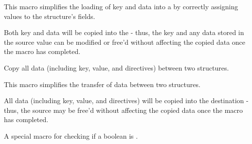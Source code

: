 

\begin{arglist}
\end{arglist}

This macro simplifies the loading of key and data into a  by correctly assigning values to the structure's fields.

\adviceuserstart
Both key and data will be copied into the  - thus, the key and any data stored in the source value can be modified or free'd without affecting the copied data once the macro has completed.
\adviceuserend


Copy all data (including key, value, and directives) between two  structures.


\begin{arglist}
\end{arglist}

This macro simplifies the transfer of data between two structures.

\adviceuserstart
All data (including key, value, and directives) will be copied into the destination  - thus, the source  may be free'd without affecting the copied data once the macro has completed.
\adviceuserend



A special macro for checking if a boolean  is .

